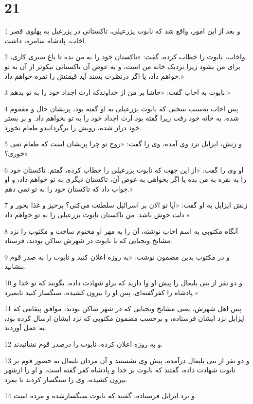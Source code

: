 \chapter{21}

\par 1 و بعد از این امور، واقع شد که نابوت یزرعیلی، تاکستانی در یزرعیل به پهلوی قصر اخاب، پادشاه سامره، داشت.
\par 2 واخاب، نابوت را خطاب کرده، گفت: «تاکستان خود را به من بده تا باغ سبزی کاری، برای من بشود زیرا نزدیک خانه من است، و به عوض آن تاکستانی نیکوتر از آن به تو خواهم داد، یا اگر درنظرت پسند آید قیمتش را نقره خواهم داد.»
\par 3 نابوت به اخاب گفت: «حاشا بر من از خداوندکه ارث اجداد خود را به تو بدهم.»
\par 4 پس اخاب به‌سبب سخنی که نابوت یزرعیلی به او گفته بود، پریشان حال و مغموم شده، به خانه خود رفت زیرا گفته بود ارث اجداد خود را به تو نخواهم داد. و بر بستر خود دراز شده، رویش را برگردانیدو طعام نخورد.
\par 5 و زنش، ایزابل نزد وی آمده، وی را گفت: «روح تو چرا پریشان است که طعام نمی خوری؟»
\par 6 او وی را گفت: «از این جهت که نابوت یزرعیلی را خطاب کرده، گفتم: تاکستان خود را به نقره به من بده یا اگر بخواهی به عوض آن، تاکستان دیگری به تو خواهم داد، و او جواب داد که تاکستان خود را به تو نمی دهم.»
\par 7 زنش ایزابل به او گفت: «آیا تو الان بر اسرائیل سلطنت می‌کنی؟ برخیز و غذا بخور و دلت خوش باشد. من تاکستان نابوت یزرعیلی را به تو خواهم داد.»
\par 8 آنگاه مکتوبی به اسم اخاب نوشته، آن را به مهر او مختوم ساخت و مکتوب را نزد مشایخ ونجبایی که با نابوت در شهرش ساکن بودند، فرستاد.
\par 9 و در مکتوب بدین مضمون نوشت: «به روزه اعلان کنید و نابوت را به صدر قوم بنشانید.
\par 10 و دو نفر از بنی بلیعال را پیش او وا دارید که براو شهادت داده، بگویند که تو خدا و پادشاه را کفرگفته‌ای. پس او را بیرون کشیده، سنگسار کنید تابمیرد.»
\par 11 پس اهل شهرش، یعنی مشایخ ونجبایی که در شهر ساکن بودند، موافق پیغامی که ایزابل نزد ایشان فرستاده، و بر‌حسب مضمون مکتوبی که نزد ایشان ارسال کرده بود، به عمل آوردند.
\par 12 و به روزه اعلان کرده، نابوت را درصدر قوم نشانیدند.
\par 13 و دو نفر از بنی بلیعال درآمده، پیش وی نشستند و آن مردان بلیعال به حضور قوم بر نابوت شهادت داده، گفتند که نابوت بر خدا و پادشاه کفر گفته است، و او را ازشهر بیرون کشیده، وی را سنگسار کردند تا بمرد.
\par 14 و نزد ایزابل فرستاده، گفتند که نابوت سنگسارشده و مرده است.
